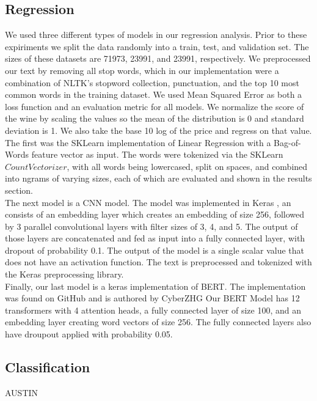\documentclass[11pt,english]{article}
\begin{document}
\subsection{Regression}
    We used three different types of models in our regression analysis. Prior to these expiriments we split the data randomly into a train, test, and validation set. The sizes of these datasets are 71973, 23991, and 23991, respectively. We preprocessed our text by removing all stop words, which in our implementation were a combination of NLTK's stopword collection, punctuation, and the top 10 most common words in the training dataset. We used Mean Squared Error as both a loss function and an evaluation metric for all models. We normalize the score of the wine by scaling the values so the mean of the distribution is 0 and standard deviation is 1. We also take the base 10 log of the price and regress on that value. \\
    The first was the SKLearn implementation of Linear Regression with a Bag-of-Words feature vector as input. The words were tokenized via the SKLearn $CountVectorizer$, with all words being lowercased, split on spaces, and combined into ngrams of varying sizes, each of which are evaluated and shown in the results section. \\
    The next model is a CNN model. The model was implemented in Keras \cite{keras}, an consists of an embedding layer which creates an embedding of size 256, followed by 3 parallel convolutional layers with filter sizes of 3, 4, and 5. The output of those layers are concatenated and fed as input into a fully connected layer, with dropout of probability 0.1. The output of the model is a single scalar value that does not have an activation function. The text is preprocessed and tokenized with the Keras preprocessing library. \\
    Finally, our last model is a keras \cite{keras} implementation of BERT. The implementation was found on GitHub and is authored by CyberZHG \cite{keras_bert} Our BERT Model has 12 transformers with 4 attention heads, a fully connected layer of size 100, and an embedding layer creating word vectors of size 256. The fully connected layers also have droupout applied with probability 0.05.

\subsection{Classification}
AUSTIN
\end{document}
